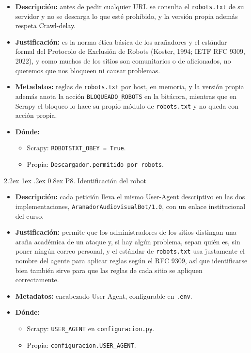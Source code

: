 \documentclass[11pt,spanish]{article}
\makeatletter
\renewcommand\paragraph{\@startsection{paragraph}{4}{\z@}%
  {2.2ex \@plus1ex \@minus.2ex}%
  {0.8ex}%
  {\normalfont\normalsize\bfseries}}
\makeatother
\begin{document}
\begin{itemize}[label=\textbullet, leftmargin=*]
    \item \textbf{Descripción:} antes de pedir cualquier URL se consulta el \texttt{robots.txt} de su servidor y no se descarga lo que esté prohibido, y la versión propia además respeta Crawl-delay.
    \item \textbf{Justificación:} es la norma ética básica de los arañadores y el estándar formal del Protocolo de Exclusión de Robots (Koster, 1994; IETF RFC 9309, 2022), y como muchos de los sitios son comunitarios o de aficionados, no queremos que nos bloqueen ni causar problemas.
    \item \textbf{Metadatos:} reglas de \texttt{robots.txt} por host, en memoria, y la versión propia además anota la acción \texttt{BLOQUEADO\_ROBOTS} en la bitácora, mientras que en Scrapy el bloqueo lo hace su propio módulo de \texttt{robots.txt} y no queda con acción propia.
    \item \textbf{Dónde:}
    \begin{itemize}[label=--, leftmargin=*]
        \item Scrapy: \texttt{ROBOTSTXT\_OBEY = True}.
        \item Propia: \texttt{Descargador.permitido\_por\_robots}.
    \end{itemize}
\end{itemize}

\paragraph{P8. Identificación del robot}

\begin{itemize}[label=\textbullet, leftmargin=*]
    \item \textbf{Descripción:} cada petición lleva el mismo User-Agent descriptivo en las dos implementaciones, \texttt{AranadorAudiovisualBot/1.0}, con un enlace institucional del curso.
    \item \textbf{Justificación:} permite que los administradores de los sitios distingan una araña académica de un ataque y, si hay algún problema, sepan quién es, sin poner ningún correo personal, y el estándar de \texttt{robots.txt} usa justamente el nombre del agente para aplicar reglas según el RFC 9309, así que identificarse bien también sirve para que las reglas de cada sitio se apliquen correctamente.
    \item \textbf{Metadatos:} encabezado User-Agent, configurable en \texttt{.env}.
    \item \textbf{Dónde:}
    \begin{itemize}[label=--, leftmargin=*]
        \item Scrapy: \texttt{USER\_AGENT} en \texttt{configuracion.py}.
        \item Propia: \texttt{configuracion.USER\_AGENT}.
    \end{itemize}
\end{itemize}
\end{document}
